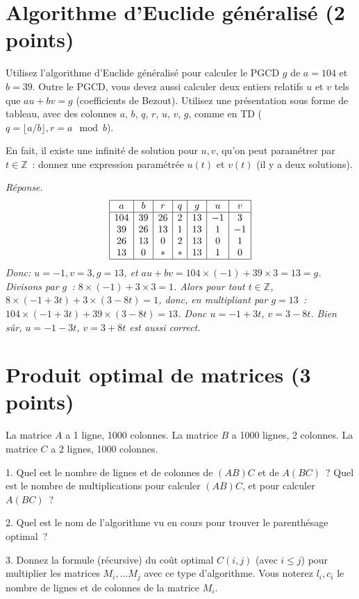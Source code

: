 \documentclass[11pt]{article}
\def\Z{\mathbb Z}
\begin{document}
{
\section{Algorithme d'Euclide généralisé (2 points)}
Utilisez  l'algorithme d'Euclide généralisé
pour calculer le PGCD $g$ de $a=104$ et $b=39$. Outre le PGCD, vous devez
aussi calculer deux entiers relatifs $u$ et $v$ tels que $a u + b v=g$ (coefficients de Bezout). 
Utilisez une présentation sous forme de tableau, avec des colonnes $a$, $b$, $q$, $r$, $u$, $v$, $g$, comme en TD ($q=\lfloor a/b\rfloor, r=a \mod b$).

En fait, il existe une infinité de solution pour $u, v$, qu'on peut paramétrer par $t\in \Z$~: donnez une expression paramétrée  $u(t)$ et $v(t)$ (il y a deux solutions).
}

\ifcorrige
{\it Réponse.
$$\begin{array}{|c|c|c|c|c|c|c|}
\hline
a & b & r & q & g & u & v \\
\hline
104 & 39 & 26 & 2 & 13 & -1 & 3 \\
39 & 26 & 13 & 1 & 13 & 1 & -1 \\
26 & 13 & 0 & 2 & 13 & 0 & 1 \\
13 & 0 & * & * & 13 & 1 & 0 \\
\hline
\end{array}
$$
Donc: $u=-1, v=3, g=13$, et $au+bv=104\times  (-1) + 39\times 3= 13=g$.
Divisons par $g$~: $8\times (-1) + 3\times 3=1$. Alors pour tout $t\in \Z$,
$8\times (-1+3t) + 3\times (3-8t)=1$, donc, en multipliant par $g=13$~: $104\times (-1+3t) + 39\times (3-8t)=13$.
Donc $u=-1+3t$, $v=3-8t$. Bien sûr, $u=-1-3t$, $v=3+8t$ est aussi correct.
}
\else\fi

\section{Produit optimal de matrices (3 points)}
La matrice $A$ a 1 ligne, 1000 colonnes.
La matrice $B$ a 1000 lignes, 2 colonnes.
La matrice $C$ a 2 lignes, 1000 colonnes.
 

1. Quel est le nombre de lignes et de colonnes de $(AB)C$ et de $A(BC)$~?
Quel est le nombre de multiplications pour calculer $(AB)C$, et pour calculer $A(BC)$~?

2. Quel est le nom de l'algorithme vu en cours pour trouver le parenthésage optimal~?

 

3. Donnez la formule (récursive) du coût optimal $C(i, j)$ (avec $i\le j$) pour multiplier les matrices
$M_i, \ldots M_j$ avec ce type d'algorithme. Vous noterez $l_i, c_i$ le nombre de lignes et de colonnes de la matrice $M_i$.

\else\fi
\end{document}
